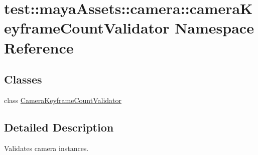 \hypertarget{namespacetest_1_1mayaAssets_1_1camera_1_1cameraKeyframeCountValidator}{\section{test\-:\-:maya\-Assets\-:\-:camera\-:\-:camera\-Keyframe\-Count\-Validator \-Namespace \-Reference}
\label{da/dd3/namespacetest_1_1mayaAssets_1_1camera_1_1cameraKeyframeCountValidator}
}
\subsection*{\-Classes}
\begin{DoxyCompactItemize}
\item 
class \hyperlink{classtest_1_1mayaAssets_1_1camera_1_1cameraKeyframeCountValidator_1_1CameraKeyframeCountValidator}{\-Camera\-Keyframe\-Count\-Validator}
\end{DoxyCompactItemize}


\subsection{\-Detailed \-Description}
\begin{DoxyVerb}
Validates camera instances.
\end{DoxyVerb}
 